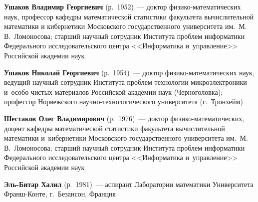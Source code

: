 \begin{multicols}{2}
\noindent
\textbf{Ушаков Владимир Георгиевич} (р.\ 1952)~--- 
доктор фи\-зи\-ко-ма\-те\-ма\-ти\-че\-ских наук, 
профессор кафедры математической статистики факультета вычислительной 
математики и кибернетики Московского\linebreak
 государственного университета им.\ 
М.\,В.~Ломоносова; старший научный сотрудник Института\linebreak
 проб\-лем информатики Федерального 
 исследовательского центра <<Информатика и~управ\-ление>> Российской академии наук
 
 \vspace*{3pt}
  
 
 \noindent
\textbf{Ушаков Николай Георгиевич} (р.\ 1954)~--- 
доктор фи\-зи\-ко-ма\-те\-ма\-ти\-че\-ских наук, ведущий научный сотруд\-ник
 Института проб\-лем технологии микроэлектроники и~особо чистых материалов 
 Российской академии наук (Черноголовка); профессор Норвежского 
 на\-уч\-но-тех\-но\-ло\-ги\-че\-ско\-го университета (г.~Тронхейм)

 \vspace*{3pt}
 
  
 \noindent
\textbf{Шестаков Олег Владимирович} (р.\ 1976)~---
доктор фи\-зи\-ко-ма\-те\-ма\-ти\-че\-ских, 
доцент кафедры математической статистики факультета вычислительной математики 
и~кибернетики Московского государ\-ственного университета им.\ М.\,В.~Ломоносова; 
старший научный сотрудник Института проб\-лем информатики Федерального 
 исследовательского центра <<Информатика и~управ\-ление>> Российской академии наук
 
 \vspace*{3pt}
 
\noindent
\textbf{Эль-Битар Халил} (р.\ 1981)~---
аспирант 
Лаборатории математики Университета Франш-Кон\-те, г.~Безансон, Франция



 \label{end\stat}






\end{multicols}

\newpage